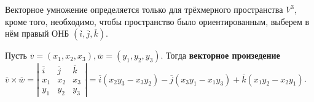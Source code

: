   
	  Векторное умножение определяется только для трёхмерного пространства $V^3$, кроме того, необходимо, чтобы пространство было ориентированным, выберем в нём правый ОНБ $(\overline{i}, \overline{j}, \overline{k})$.
	  
	  \begin{figure}[h]
		  \centering
		  \def\svgwidth{0.2\columnwidth}
		  
	  \end{figure}
	  \begin{Def}
		  Пусть $\overline{v} = (x_1, x_2, x_3), \overline{w} = (y_1, y_2, y_3)$. Тогда \textbf{векторное произедение} \\
		  $\overline{v} \times \overline{w} = \left|\begin{array}{cccc}
			  \overline{i} & \overline{j} & \overline{k} \\ 
			  x_1 & x_2 & x_3 \\ 
			  y_1 & y_2 & y_3
			  \end{array}\right| = \overline{i}(x_2 y_3 - x_3y_2) - \overline{j}(x_3 y_1 - x_1 y_3) + \overline{k}(x_1 y_2 - x_2 y_1)$.
	  \end{Def}
	  

